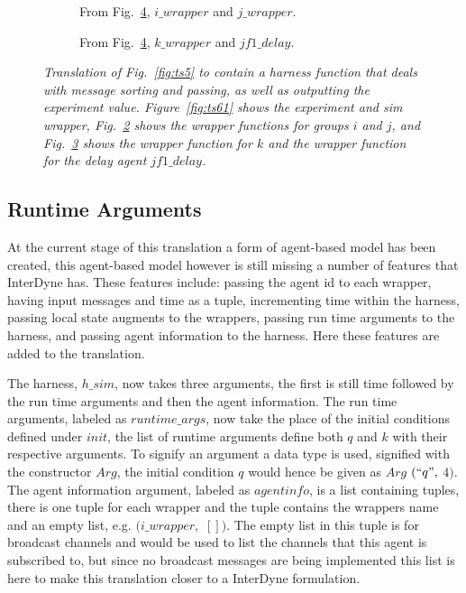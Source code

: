 \documentclass{article}
\begin{document}
\begin{figure}[H]\ContinuedFloat
	\centering
	\begin{subfigure}[b]{1\textwidth}
	
	\caption{From Fig.~\ref{fig:ts6}, $i\_wrapper$ and $j\_wrapper$.  }
        \label{fig:ts62}
	\end{subfigure}
	\caption*{}
\end{figure}
	
\begin{figure}[H]\ContinuedFloat
	\centering
	\begin{subfigure}[b]{1\textwidth}
	
	\caption{From Fig.~\ref{fig:ts6}, $k\_wrapper$ and $jf1\_delay$.  }
        \label{fig:ts63}
	\end{subfigure}
	\caption{\it Translation of Fig.~\ref{fig:ts5} to contain a harness function that deals with message sorting and passing, as well as outputting the experiment value. Figure~\ref{fig:ts61} shows the experiment and sim wrapper, Fig.~\ref{fig:ts62} shows the wrapper functions for groups $i$ and $j$, and Fig.~\ref{fig:ts63} shows the wrapper function for $k$ and the wrapper function for the delay agent $jf1\_delay$.}
	\label{fig:ts6}
\end{figure} 





\subsection{Runtime Arguments}
At the current stage of this translation a form of agent-based model has been created, this agent-based model however is still missing a number of features that InterDyne has. These features include: passing the agent id to each wrapper, having input messages and time as a tuple, incrementing time within the harness, passing local state augments to the wrappers, passing run time arguments to the harness, and passing agent information to the harness. Here these features are added to the translation. 

The harness, $h\_sim$, now takes three arguments, the first is still time followed by the run time arguments and then the agent information. The run time arguments, labeled as $runtime\_args$, now take the place of the initial conditions defined under $init$, the list of runtime arguments define both $q$ and $k$ with their respective arguments. To signify an argument a data type is used, signified with the constructor $Arg$, the initial condition $q$ would hence be given as $Arg$ $(``q",$ $4)$. The agent information argument, labeled as $agentinfo$, is a list containing tuples, there is one tuple for each wrapper and the tuple contains the wrappers name and an empty list, e.g. $(i\_wrapper,$ $[])$. The empty list in this tuple is for broadcast channels and would be used to list the channels that this agent is subscribed to, but since no broadcast messages are being implemented this list is here to make this translation closer to a InterDyne formulation.
\end{document}
